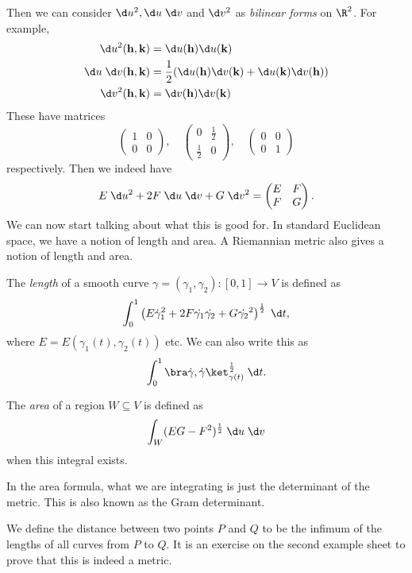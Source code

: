 \documentclass[a4paper]{article}
\begin{document}
Then we can consider $\d u^2, \d u\;\d v$ and $\d v^2$ as \emph{bilinear forms} on $\R^2$. For example,
\begin{align*}
  \d u^2 (\mathbf{h}, \mathbf{k}) &= \d u(\mathbf{h}) \d u(\mathbf{k})\\
  \d u \;\d v(\mathbf{h}, \mathbf{k}) &= \frac{1}{2} (\d u(\mathbf{h}) \d v(\mathbf{k}) + \d u(\mathbf{k}) \d v(\mathbf{h}))\\
  \d v^2 (\mathbf{h}, \mathbf{k}) &= \d v(\mathbf{h}) \d v(\mathbf{k})
\end{align*}
These have matrices
\[
  \begin{pmatrix}
    1 & 0\\
    0 & 0
  \end{pmatrix},
  \quad
  \begin{pmatrix}
    0 & \frac{1}{2}\\
    \frac{1}{2} & 0
  \end{pmatrix},
  \quad
  \begin{pmatrix}
    0 & 0\\
    0 & 1
  \end{pmatrix}
\]
respectively. Then we indeed have
\[
  E \;\d u^2 + 2F \;\d u\;\d v + G \;\d v^2 =
  \begin{pmatrix}
    E & F\\
    F & G
  \end{pmatrix}.
\]
We can now start talking about what this is good for. In standard Euclidean space, we have a notion of length and area. A Riemannian metric also gives a notion of length and area.

\begin{defi}[Length]
  The \emph{length} of a smooth curve $\gamma = (\gamma_1, \gamma_2): [0, 1] \to V$ is defined as
  \[
    \int_0^1 \left(E \dot{\gamma}_1^2 + 2F \dot{\gamma_1} \dot{\gamma_2} + G \dot{\gamma_2}^2 \right)^{\frac{1}{2}}\;\d t,
  \]
  where $E = E(\gamma_1(t), \gamma_2(t))$ etc. We can also write this as
  \[
    \int_0^1 \bra \dot{\gamma}, \dot{\gamma}\ket_{\gamma(t)} ^{\frac{1}{2}} \;\d t.
  \]
\end{defi}
\begin{defi}[Area]
  The \emph{area} of a region $W \subseteq V$ is defined as
  \[
    \int_W (EG - F^2)^{\frac{1}{2}} \;\d u\;\d v
  \]
  when this integral exists.
\end{defi}
In the area formula, what we are integrating is just the determinant of the metric. This is also known as the Gram determinant.

We define the distance between two points $P$ and $Q$ to be the infimum of the lengths of all curves from $P$ to $Q$. It is an exercise on the second example sheet to prove that this is indeed a metric.
\end{document}
